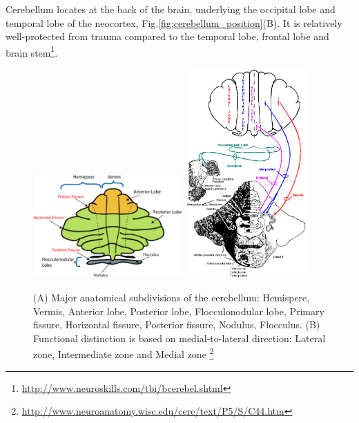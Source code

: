 Cerebellum locates at the back of the brain, underlying the occipital lobe and
temporal lobe of the neocortex, Fig.\ref{fig:cerebellum_position}(B). It is
relatively well-protected from trauma compared to the temporal lobe, frontal
lobe and brain
stem\footnote{\url{http://www.neuroskills.com/tbi/bcerebel.shtml}}.



\begin{figure}[hbt]
  \centerline{
  \includegraphics[height=4cm,
    angle=0]{./images/cerebellum_lobes.eps}
  \includegraphics[height=8cm,
    angle=0]{./images/cereberrum_function_division.eps}  
    }
\caption{ (A) Major anatomical subdivisions of the cerebellum: Hemispere,
Vermis, Anterior lobe, Posterior lobe, Flocculonodular lobe, Primary fissure, Horizontal
fissure, Posterior fissure, Nodulus, Flocculus. (B) Functional
distinction is based on medial-to-lateral direction: Lateral zone,
Intermediate zone and Medial zone
\footnote{\url{http://www.neuroanatomy.wisc.edu/cere/text/P5/S/C44.htm}}}
\label{fig:cerebellum_anatomy}
\end{figure}


